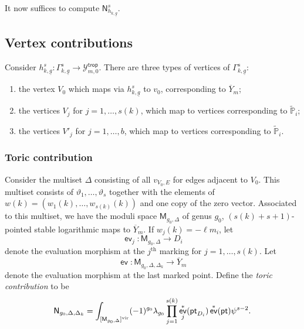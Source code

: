 \documentclass[11pt]{amsart}
\numberwithin{equation}{section}
\theoremstyle{plain}
\theoremstyle{remark}
\theoremstyle{definition}
\DeclareMathOperator{\ev}{\mathsf{ev}}
\newcommand{\cY}{\mathcal{Y}}
\newcommand{\PP}{\mathbb{P}}
\newcommand{\vir}{\text{\rm vir}}
\newcommand{\supth}[1]{\ensuremath{#1^{\mathrm{th}}}}
\begin{document}
It now suffices  to compute $\mathsf{N}_{h_{k,\underline{g}}}^s$.

\subsection{Vertex contributions}
Consider $h_{k,\underline{g}}^s\colon \Gamma_{k,\underline{g}}^s \rightarrow \cY_{m,0}^{\mathsf{trop}}$. There are three types of vertices of $\Gamma_{k,\underline{g}}^s$: 
\begin{enumerate}
    \item the vertex $V_0$ which maps via $h_{k,\underline{g}}^s$ to $v_0$, corresponding to $\overline{Y}_m$; 
    \item the vertices $V_{j}$ for $j=1,\dots,s(k)$, which map to vertices corresponding to $\tilde{\PP}_i$; 
    \item\label{type3} the vertices $V'_{j}$ for $j=1,\dots, b$, which map to vertices corresponding to $\tilde{\PP}_i$.
\end{enumerate}
\subsubsection{Toric contribution}

Consider the multiset $\Delta$ consisting of all $v_{V_0,E}$ for edges adjacent to $V_0$. This multiset consists of $\vartheta_{1},\dots,\vartheta_{s}$ together with the elements of $w(k)= (w_1(k),\dots,w_{s(k)}(k))$ and one copy of the zero vector. Associated to this multiset, we have the moduli space $\mathsf{M}_{g_0,\Delta}$  of genus $g_0$, $(s(k) + s + 1)$-pointed stable logarithmic maps to $\overline{Y}_m$. If $w_{j}(k) = -\ell m_i$, let
$$\ev_{j} \colon \mathsf{M}_{g_0,\Delta} \longrightarrow D_{i}$$
denote the evaluation morphism at the $\supth{j}$ marking for $j=1,\dots,s(k)$. Let
$$\ev \colon \mathsf{M}_{g_0,\Delta, \Delta_k} \longrightarrow \overline{Y}_m$$
denote the evaluation morphism at the last marked point. Define the \emph{toric contribution} to be $$\mathsf{N}_{g_0,\Delta, \Delta_k} = \int_{[\mathsf{M}_{g_0,\Delta}]^{\vir}} (-1)^{g_0} \lambda_{g_0} \prod_{j=1}^{s(k)} \ev_{j}^{*}(\mathsf{pt}_{D_i})\ev^* (\mathsf{pt})\psi^{s-2}.$$
\end{document}
